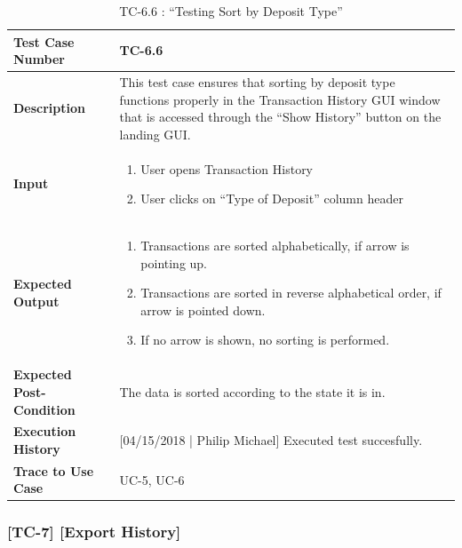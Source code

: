 \documentclass[12pt]{article}
\begin{document}
\begin{table}[H]
\caption{TC-6.6 : “Testing Sort by Deposit Type”}
\begin{center}
\begin{tabular}{|p{5.5	cm}|p{11cm}|}
  \hline
  \bf Test Case Number & TC-6.6\\\hline
  \bf Description & This test case ensures that sorting by deposit type functions properly in the Transaction History GUI window that is accessed through the ``Show History'' button on the landing GUI.\\\hline
  \bf Input &
  \begin{enumerate}
  \item User opens Transaction History
  \item User clicks on ``Type of Deposit'' column header
  \end{enumerate}
  \\\hline
  \bf Expected Output &
  \begin{enumerate}
  \item Transactions are sorted alphabetically, if arrow is pointing up.
  \item Transactions are sorted in reverse alphabetical order, if arrow is pointed down.
  \item If no arrow is shown, no sorting is performed.
  \end{enumerate}
  \\\hline
  \bf Expected Post-Condition & The data is sorted according to the state it is in.\\\hline
  \bf Execution History & [04/15/2018 | Philip Michael] Executed test succesfully.\\\hline
  \bf Trace to Use Case & UC-5, UC-6\\

  \hline
\end{tabular}
\end{center}
\end{table}

\subsubsection{[TC-7] [Export History]} \label{tc:7}
\end{document}
